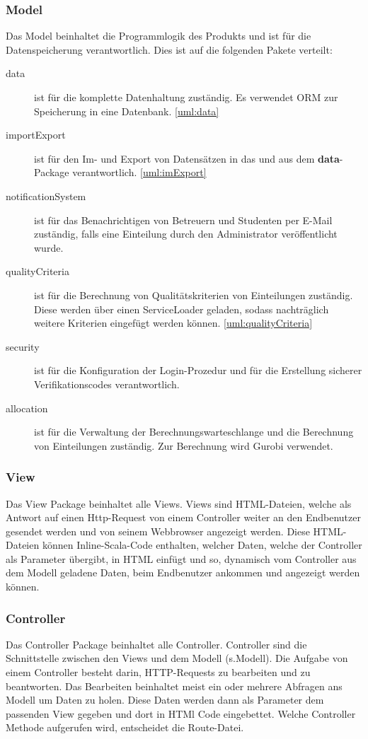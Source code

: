 \documentclass[parskip=full]{scrartcl}
\begin{document}
\subsubsection{Model}
Das Model beinhaltet die Programmlogik des Produkts und ist für die
Datenspeicherung verantwortlich. Dies ist auf die folgenden Pakete
verteilt:
\begin{description}
\item[data] ist für die komplette Datenhaltung zuständig. Es verwendet ORM zur
Speicherung in eine Datenbank. \autoref{uml:data}
\item[importExport] ist für den Im- und Export von Datensätzen in das und aus dem
\textsf{\textbf{data}}-Package verantwortlich. \autoref{uml:imExport}
\item[notificationSystem] ist für das Benachrichtigen von Betreuern und
Studenten per E-Mail zuständig, falls eine Einteilung durch den Administrator
veröffentlicht wurde. %
\item[qualityCriteria] ist für die Berechnung von Qualitätskriterien von
Einteilungen zuständig. Diese werden über einen ServiceLoader geladen, sodass
nachträglich weitere Kriterien eingefügt werden können.
\autoref{uml:qualityCriteria}
\item[security] ist für die Konfiguration der Login-Prozedur und für die
Erstellung sicherer Verifikationscodes verantwortlich.
\item[allocation] ist für die Verwaltung der Berechnungswarteschlange und die
Berechnung von Einteilungen zuständig. Zur Berechnung wird Gurobi verwendet.
\end{description}

   \subsubsection{View}
   Das View Package beinhaltet alle Views. Views sind HTML-Dateien, welche als Antwort auf einen Http-Request von einem Controller weiter an den Endbenutzer gesendet werden und von seinem Webbrowser angezeigt werden. Diese HTML-Dateien können Inline-Scala-Code enthalten, welcher Daten, welche der Controller als Parameter übergibt, in HTML einfügt und so, dynamisch vom Controller aus dem Modell geladene Daten, beim Endbenutzer ankommen und angezeigt werden können.
\subsubsection{Controller}
Das Controller Package beinhaltet alle Controller. Controller sind die Schnittstelle zwischen den Views und dem Modell (s.Modell). Die Aufgabe von einem Controller besteht darin, HTTP-Requests zu bearbeiten und zu beantworten. Das Bearbeiten beinhaltet meist ein oder mehrere Abfragen ans Modell um Daten zu holen. Diese Daten werden dann als Parameter dem passenden View gegeben und dort in HTMl Code eingebettet. Welche Controller Methode aufgerufen wird, entscheidet die Route-Datei.
\end{document}
